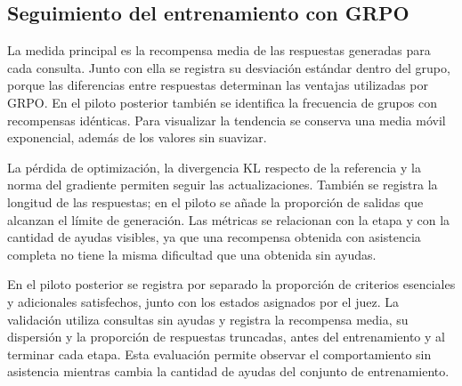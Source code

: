 \subsection{Seguimiento del entrenamiento con GRPO}
\label{sec:metricas-grpo}
La medida principal es la recompensa media de las respuestas generadas para cada consulta. Junto con ella se registra su desviación estándar dentro del grupo, porque las diferencias entre respuestas determinan las ventajas utilizadas por GRPO. En el piloto posterior también se identifica la frecuencia de grupos con recompensas idénticas. Para visualizar la tendencia se conserva una media móvil exponencial, además de los valores sin suavizar.

La pérdida de optimización, la divergencia KL respecto de la referencia y la norma del gradiente permiten seguir las actualizaciones. También se registra la longitud de las respuestas; en el piloto se añade la proporción de salidas que alcanzan el límite de generación. Las métricas se relacionan con la etapa y con la cantidad de ayudas visibles, ya que una recompensa obtenida con asistencia completa no tiene la misma dificultad que una obtenida sin ayudas.

En el piloto posterior se registra por separado la proporción de criterios esenciales y adicionales satisfechos, junto con los estados asignados por el juez. La validación utiliza consultas sin ayudas y registra la recompensa media, su dispersión y la proporción de respuestas truncadas, antes del entrenamiento y al terminar cada etapa. Esta evaluación permite observar el comportamiento sin asistencia mientras cambia la cantidad de ayudas del conjunto de entrenamiento.
